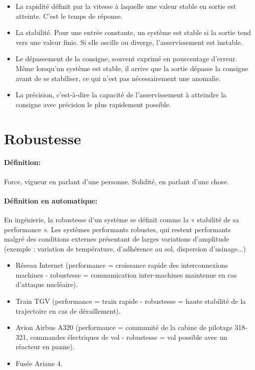 \documentclass[12pt, a4paper, openany]{report}
\begin{document}
 \begin{itemize} [label=,font=\small \color{black}]
  	\item La rapidité définit par la vitesse à laquelle une valeur stable en sortie est atteinte. C'est le temps de réponse. 
    \item La stabilité. Pour une entrée constante, un système est stable si la sortie tend vers une valeur finie. Si elle oscille ou diverge, l'asservissement est instable. 
    \item Le dépassement de la consigne, souvent exprimé en pourcentage d'erreur. Même lorsqu'un système est stable, il arrive que la sortie dépasse la consigne avant de se stabiliser, ce qui n'est pas nécessairement une anomalie.
   \item La précision, c’est-à-dire la capacité de l'asservissement à atteindre la consigne avec précision le plus rapidement possible.\cite{ref4}
  \end{itemize}
 
 \section*{Robustesse}
 
 \paragraph{Définition:} Force, vigueur en parlant d'une personne. Solidité, en parlant d'une chose.\cite{ref6}
 
 \paragraph{Définition en automatique:}  En ingénierie, la robustesse d'un système se définit comme la « stabilité de sa performance ». Les systèmes performants robustes, qui restent performants malgré des conditions externes présentant de larges variations d'amplitude (exemple : variation de température, d'adhérence au sol, dispersion d'usinage...)
 
 \begin{itemize} [label=,font=\small \color{black}]
  	\item Réseau Internet (performance = croissance rapide des interconnexions machines - robustesse = communication inter-machines maintenue en cas d'attaque nucléaire). 
    \item Train TGV (performance = train rapide - robustesse = haute stabilité de la trajectoire en cas de déraillement). 
    \item Avion Airbus A320 (performance = communité de la cabine de pilotage 318-321, commandes électriques de vol - robustesse = vol possible avec un réacteur en panne).
    \item Fusée Ariane 4.\cite{ref5}
  \end{itemize}
 
\end{document}
